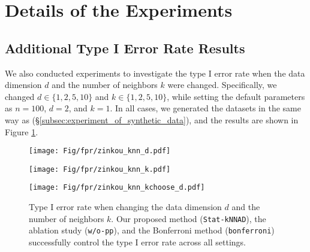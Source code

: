 \section{Details of the Experiments}
\label{app:appC}

\subsection{Additional Type I Error Rate Results}
\label{app:appC1}
%
We also conducted experiments to investigate the type I error rate when the data dimension $d$ and the number of neighbors $k$ were changed.
%
Specifically, we changed $d \in \{1, 2, 5, 10\}$ and $k \in \{1, 2, 5, 10\}$, while setting the default parameters as $n=100$, $d=2$, and $k=1$.
%
In all cases, we generated the datasets in the same way as  (\S{\ref{subsec:experiment_of_synthetic_data}}), and the results are shown in Figure \ref{fig:fpr_d}.
%
\begin{figure}[htbp]
  \begin{minipage}[b]{0.32\linewidth}
      \centering
      \texttt{[image: Fig/fpr/zinkou\_knn\_d.pdf]}
  \end{minipage}
  \begin{minipage}[b]{0.32\linewidth}
      \centering
      \texttt{[image: Fig/fpr/zinkou\_knn\_k.pdf]}
  \end{minipage}
  \begin{minipage}[b]{0.32\linewidth}
    \centering
    \texttt{[image: Fig/fpr/zinkou\_knn\_kchoose\_d.pdf]}
\end{minipage}
  
  \caption{
      Type I error rate when changing the data dimension $d$ and the number of neighbors $k$.
      Our proposed method (\texttt{Stat-kNNAD}), the ablation study (\texttt{w/o-pp}), and the Bonferroni method (\texttt{bonferroni}) successfully control the type I error rate across all settings.
  }
  \label{fig:fpr_d}
\end{figure}
%


